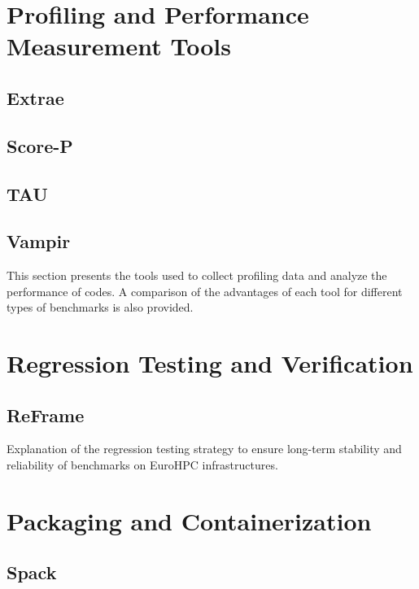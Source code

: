 \section{Profiling and Performance Measurement Tools}
\label{sec:methodology-tools}

\subsection{Extrae}
\label{sec:methodology-tools-extrae}
\subsection{Score-P}
\label{sec:methodology-tools-scorep}

\subsection{TAU}
\label{sec:methodology-tools-tau}

\subsection{Vampir}
\label{sec:methodology-tools-vampir}

This section presents the tools used to collect profiling data and analyze the performance of codes. 
A comparison of the advantages of each tool for different types of benchmarks is also provided.

\section{Regression Testing and Verification}
\label{sec:methodology-regression}

\subsection{ReFrame}
\label{sec:methodology-regression-reframe}

Explanation of the regression testing strategy to ensure long-term stability and reliability of benchmarks on EuroHPC infrastructures.

\section{Packaging and Containerization}
\label{sec:methodology-packaging}

\subsection{Spack}
\label{sec:methodology-packaging-spack}



